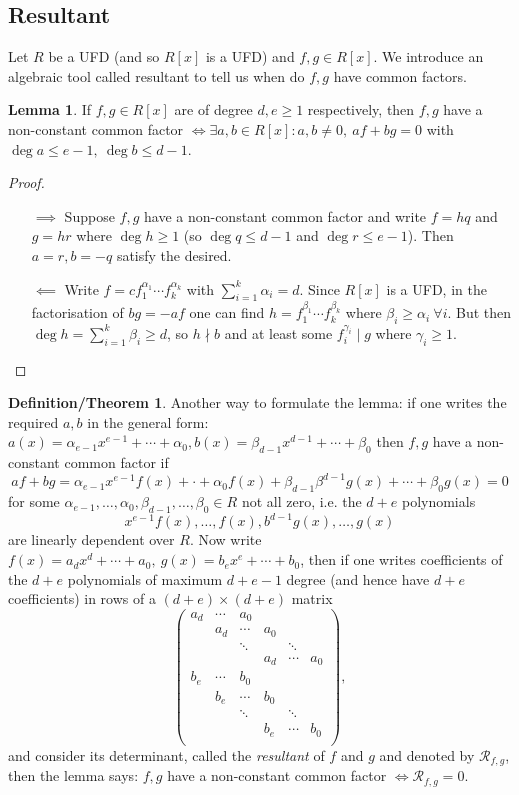 \documentclass{article}
\newcommand{\re}{\mathcal{R}}
\theoremstyle{definition}
\newtheorem{lemma}[defn]{Lemma}
\newtheorem{defnthm}[defn]{Definition/Theorem}
\begin{document}
\subsection{Resultant}
Let $R$ be a UFD (and so $R[x]$ is a UFD) and $f,g\in R[x]$. We introduce an algebraic tool called resultant to tell us when do $f,g$ have common factors.

\begin{lemma}
If $f,g\in R[x]$ are of degree $d,e\geq 1$ respectively, then $f,g$ have a non-constant common factor $\iff\exists a,b\in R[x]:a,b\neq 0,\ af+bg=0$ with $\deg a\leq e-1,\ \deg b\leq d-1$.
\end{lemma}
\begin{proof}
\begin{itemize}
\item[$\implies$] Suppose $f,g$ have a non-constant common factor and write $f=hq$ and $g=hr$ where $\deg h\geq 1$ (so $\deg q\leq d-1$ and $\deg r\leq e-1$). Then $a=r,b=-q$ satisfy the desired.
\item[$\impliedby$] Write $f=cf_1^{\alpha_1}\cdots f_k^{\alpha_k}$ with $\sum_{i=1}^k\alpha_i=d$. Since $R[x]$ is a UFD, in the factorisation of $bg=-af$ one can find $h=f_1^{\beta_1}\cdots f_k^{\beta_k}$ where $\beta_i\geq\alpha_i \ \forall i$. But then $\deg h=\sum_{i=1}^k\beta_i\geq d$, so $h\nmid b$ and at least some $f_i^{\gamma_i}\mid g$ where $\gamma_i\geq 1$.
\end{itemize}
\end{proof}

\begin{defnthm}
\label{defnthm:resultant}
Another way to formulate the lemma: if one writes the required $a,b$ in the general form: $a(x)=\alpha_{e-1}x^{e-1}+\cdots+\alpha_0,b(x)=\beta_{d-1}x^{d-1}+\cdots+\beta_0$ then $f,g$ have a non-constant common factor if
\[
af+bg=\alpha_{e-1}x^{e-1}f(x)+\cdot+\alpha_0f(x)+\beta_{d-1}\beta^{d-1}g(x)+\cdots+\beta_0g(x)=0
\]
for some $\alpha_{e-1},\ldots,\alpha_0,\beta_{d-1},\ldots,\beta_0\in R$ not all zero, i.e. the $d+e$ polynomials
\[
x^{e-1}f(x),\ldots,f(x),b^{d-1}g(x),\ldots,g(x)
\]
are linearly dependent over $R$. Now write $f(x)=a_dx^d+\cdots+a_0,\ g(x)=b_ex^e+\cdots+b_0$, then if one writes coefficients of the $d+e$ polynomials of maximum $d+e-1$ degree (and hence have $d+e$ coefficients) in rows of a $(d+e)\times (d+e)$ matrix
\[
\begin{pmatrix}
a_d & \cdots & a_0 \\
& a_d & \cdots & a_0 \\
& & \ddots & & \ddots \\
& & & a_d & \cdots & a_0 \\
b_e & \cdots & b_0 \\
& b_e & \cdots & b_0 \\
& & \ddots & & \ddots \\
& & & b_e & \cdots & b_0 \\
\end{pmatrix},
\]
and consider its determinant, called the \textit{resultant} of $f$ and $g$ and denoted by $\re_{f,g}$, then the lemma says: $f,g$ have a non-constant common factor $\iff\re_{f,g}=0$.
\end{defnthm}
\end{document}
